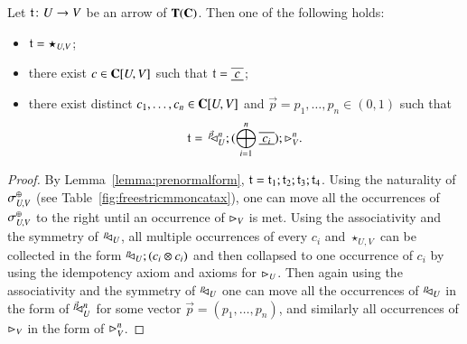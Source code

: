 \begin{lemma}\label{lemmaABform}
Let $\mathfrak{t}\colon U \to V$ be an arrow of $\mathbf{T}(\mathbf{C})$. Then one of the following holds: 
\begin{itemize}
\item $\mathfrak{t}=\star_{U,V}$;
\item there exist  $c \in \mathbf{C}[U,V]$ such that $\t=\tapeFunct{c}$;
\item there exist distinct $c_1, \dots, c_n \in \mathbf{C}[U,V]$ and $\vec{p}=p_1, \dots, p_{n}\in (0,1)$ such that
\[\t=\, \diagpn{\vec{p}\;}{U}{n}
;  (\bigoplus_{i=1}^n  \tapeFunct{c_i})  ; \codiag{V}^n\text{.}\]
\end{itemize}
\end{lemma}
\begin{proof}
By Lemma~\ref{lemma:prenormalform}, $\mathfrak{t}= \mathfrak{t}_1;\mathfrak{t}_2;\mathfrak{t}_3;\mathfrak{t}_4$.
Using the naturality of $\sigma_{U,V}^{\oplus}$ (see Table~\ref{fig:freestricmmoncatax}), one can move all the occurrences of $\sigma_{U,V}^{\oplus}$ to the right until an occurrence of $\rhd_{V}$ is met. 
Using the associativity and the symmetry of $^p\!\! \lhd_{U}$,  all multiple occurrences of every $c_i$ and $\star_{U,V}$ can be collected in the form $^p\!\! \lhd_{U};(c_i\otimes c_i)$ and then collapsed to one occurrence of $c_i$ by using the idempotency axiom and axioms for $\rhd_{U}$. Then again using the associativity and the symmetry of $^p\!\! \lhd_{U}$ one can move all the occurrences of $^p\!\! \lhd_{U}$ in the form of $^{\vec{p}\;}\!\!\! \lhd_{U}^{n}$ for some vector $\vec{p}=(p_1,\dots,p_n)$, and similarly all occurrences of $\rhd_{V}$ in the form of $\rhd_{V}^n$.
\end{proof}

